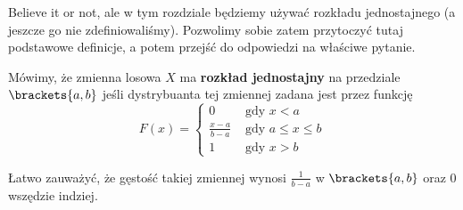 Believe it or not, ale w tym rozdziale będziemy używać rozkładu jednostajnego (a jeszcze go nie zdefiniowaliśmy). Pozwolimy sobie zatem przytoczyć tutaj podstawowe definicje, a potem przejść do odpowiedzi na właściwe pytanie.

\begin{definition}
	Mówimy, że zmienna losowa \( X \) ma \textbf{rozkład jednostajny} na przedziale \( \brackets{a, b} \) jeśli dystrybuanta tej zmiennej zadana jest przez funkcję
	\[
		F(x) = \begin{cases}
			0                   & \text{ gdy } x < a           \\
			\frac{x - a}{b - a} & \text{ gdy } a \leq x \leq b \\
			1                   & \text{ gdy } x > b
		\end{cases}
	\]
\end{definition}
Łatwo zauważyć, że gęstość takiej zmiennej wynosi \( \frac{1}{b-a} \) w \( \brackets{a, b} \) oraz 0 wszędzie indziej.
